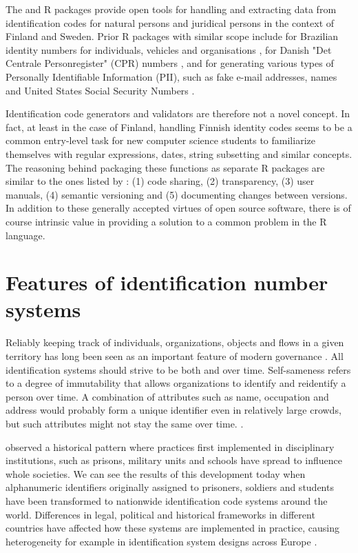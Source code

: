 The  and  R packages provide open tools for handling and extracting data from identification codes for natural persons and juridical persons in the context of Finland and Sweden. Prior R packages with similar scope include  for Brazilian identity numbers for individuals, vehicles and organisations \citep{numbersbr},  for Danish "Det Centrale Personregister" (CPR) numbers \citep{cprr}, and  for generating various types of Personally Identifiable Information (PII), such as fake e-mail addresses, names and United States Social Security Numbers \citep{generator}.

Identification code generators and validators are therefore not a novel concept. In fact, at least in the case of Finland, handling Finnish identity codes seems to be a common entry-level task for new computer science students to familiarize themselves with regular expressions, dates, string subsetting and similar concepts. The reasoning behind packaging these functions as separate R packages are similar to the ones listed by \citet{wickham2022}: (1) code sharing, (2) transparency, (3) user manuals, (4) semantic versioning and (5) documenting changes between versions. In addition to these generally accepted virtues of open source software, there is of course intrinsic value in providing a solution to a common problem in the R language.

\section{Features of identification number systems}

Reliably keeping track of individuals, organizations, objects and flows in a given territory has long been seen as an important feature of modern governance \citep{dodge2005}. All identification systems should strive to be both  and  over time. Self-sameness refers to a degree of immutability that allows organizations to identify and reidentify a person over time. A combination of attributes such as name, occupation and address would probably form a unique identifier even in relatively large crowds, but such attributes might not stay the same over time. \citep{brensinger2021}.

\citet[115-120]{foucault7778} observed a historical pattern where practices first implemented in disciplinary institutions, such as prisons, military units and schools have spread to influence whole societies. We can see the results of this development today when alphanumeric identifiers originally assigned to prisoners, soldiers and students have been transformed to nationwide identification code systems around the world. Differences in legal, political and historical frameworks in different countries have affected how these systems are implemented in practice, causing heterogeneity for example in identification system designs across Europe \citep{otjacques2007}. 

